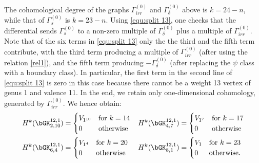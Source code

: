 The cohomological degree of the graphs $\Gamma^{(0)}_{irr}$ and $\Gamma^{(0)}_{\delta}$ above is $k=24-n$, while that of $\Gamma^{(0)}_{s}$ is $k=23-n$.
Using \eqref{equ:split 13},
one checks that the differential sends $\Gamma^{(0)}_{s}$ to a non-zero multiple of $\Gamma^{(0)}_{\delta}$ plus a multiple of $\Gamma^{(0)}_{irr}$. Note that of the six terms in \eqref{equ:split 13} only the the third and the fifth term contribute, with the third term producing a multiple of $\Gamma^{(0)}_{irr}$ (after using the relation \eqref{rel1}), and the fifth term producing $-\Gamma^{(0)}_{\delta}$ (after replacing the $\psi$ class with a boundary class). In particular, the first term in the second line of \eqref{equ:split 13} is zero in this case because there cannot be a weight 13 vertex of genus 1 and valence 11.
In the end, we retain only one-dimensional cohomology, generated by $\Gamma^{(0)}_{irr}$. We hence obtain:
\begin{align*}   H^k(\myB_{2,10}) &=
    \begin{cases}
        V_{1^{10}} & \text{for $k=14$} \\
        0 & \text{otherwise}
    \end{cases}
&
H^k(\myB_{4,7}) &=
    \begin{cases}
        V_{1^{7}} & \text{for $k=17$} \\
        0 & \text{otherwise}
    \end{cases}
\\
H^k(\myB_{6,4}) &=
\begin{cases}
    V_{1^{4}} & \text{for $k=20$} \\
    0 & \text{otherwise}
\end{cases}     
&
H^k(\myB_{8,1}) &=
\begin{cases}
    V_1 & \text{for $k=23$} \\
    0 & \text{otherwise.}
\end{cases}  
\end{align*}



